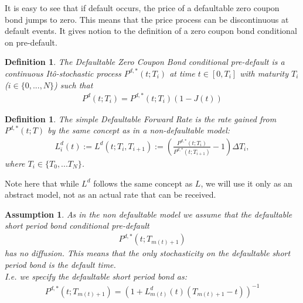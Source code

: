 \documentclass[12pt]{article}
\newtheorem{assumption}{Assumption}[section]
\newtheorem{definition}[theorem]{Definition}
\begin{document}
	It is easy to see that if default occurs, the price of a defaultable zero coupon bond jumps to zero. This means that the price process can be discontinuous at default events. It gives notion to the definition of a zero coupon bond conditional on pre-default.
	\begin{definition}
		The \emph{Defaultable Zero Coupon Bond conditional pre-default} is a continuous Itô-stochastic process \(P^{d,*}(t; T_i)\) at time \(t \in \left[0, T_i\right]\) with maturity $T_i$ ($i \in \{0, ..., N\}$) such that
		\begin{align*}
			P^{d}(t; T_i) = P^{d,*}(t; T_i)(1 - J(t))
		\end{align*}
	\end{definition}
	\begin{definition}
		The \emph{simple Defaultable Forward Rate} is the rate gained from \(P^{d,*}(t; T)\) by the same concept as in a non-defaultable model:
		\begin{align}\label{defLIBOR}
		L^{d}_i(t) := L^{d}(t; T_i, T_{i+1}) := \left( \frac{P^{d,*}(t; T_i)}{P^{d,*}(t; T_{i+1})} - 1\right) \Delta T_i,
		\end{align}
		where \(T_i \in \{T_0, ... T_N\}\).
	\end{definition}
	Note here that while $L^d$ follows the same concept as $L$, we will use it only as an abstract model, not as an actual rate that can be received.
	
	\begin{assumption}
		\label{as:DLMMShortPeriodBond}
		As in the non defaultable model we assume that the defaultable short period bond conditional pre-default
		\begin{align*}
			P^{d,*}(t;T_{m(t)+1})
		\end{align*}
		has no diffusion. This means that the only stochasticity on the defaultable short period bond is the default time.\\
		I.e. we specify the defaultable short period bond as:
		\begin{align*}
			P^{d,*}(t;T_{m(t)+1}) = (1 + L^d_{m(t)}(t)(T_{m(t)+1} - t))^{-1}
		\end{align*}
	\end{assumption}
	
\end{document}
